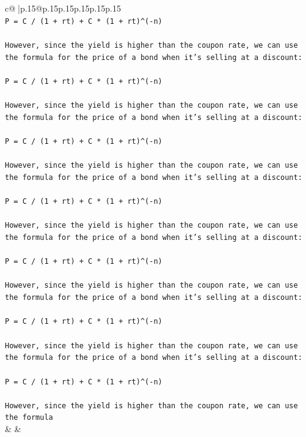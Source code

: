 \documentclass{article}
\begin{document}
{\begin{supertabular}{c@{$\;$}|p{.15\linewidth}@{}p{.15\linewidth}p{.15\linewidth}p{.15\linewidth}p{.15\linewidth}p{.15\linewidth}}
{{{\\ 
\texttt{P = C / (1 + rt) + C * (1 + rt)\^{}({-}n)} \\
\\ 
\texttt{However, since the yield is higher than the coupon rate, we can use the formula for the price of a bond when it's selling at a discount:} \\
\\ 
\texttt{P = C / (1 + rt) + C * (1 + rt)\^{}({-}n)} \\
\\ 
\texttt{However, since the yield is higher than the coupon rate, we can use the formula for the price of a bond when it's selling at a discount:} \\
\\ 
\texttt{P = C / (1 + rt) + C * (1 + rt)\^{}({-}n)} \\
\\ 
\texttt{However, since the yield is higher than the coupon rate, we can use the formula for the price of a bond when it's selling at a discount:} \\
\\ 
\texttt{P = C / (1 + rt) + C * (1 + rt)\^{}({-}n)} \\
\\ 
\texttt{However, since the yield is higher than the coupon rate, we can use the formula for the price of a bond when it's selling at a discount:} \\
\\ 
\texttt{P = C / (1 + rt) + C * (1 + rt)\^{}({-}n)} \\
\\ 
\texttt{However, since the yield is higher than the coupon rate, we can use the formula for the price of a bond when it's selling at a discount:} \\
\\ 
\texttt{P = C / (1 + rt) + C * (1 + rt)\^{}({-}n)} \\
\\ 
\texttt{However, since the yield is higher than the coupon rate, we can use the formula for the price of a bond when it's selling at a discount:} \\
\\ 
\texttt{P = C / (1 + rt) + C * (1 + rt)\^{}({-}n)} \\
\\ 
\texttt{However, since the yield is higher than the coupon rate, we can use the formula} \\
            }
        }
    }
    & & \\ \\


\end{supertabular}}
\end{document}

